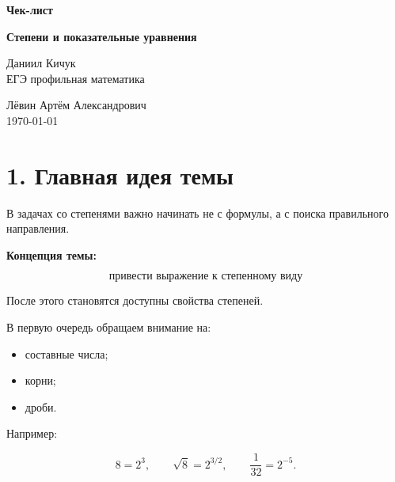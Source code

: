 \documentclass[a4paper,12pt]{article}
\begin{document}
\begin{titlepage}
\begin{center}

\vspace*{2cm}

{\Large\textcolor{darkaccent}{\textbf{Чек-лист}}}

\vspace{1cm}

{\Huge\textbf{Степени и показательные уравнения}}

\vspace{1.5cm}

{\Large Даниил Кичук}\\[0.3cm]
{\large ЕГЭ профильная математика}

\vfill

{\large Лёвин Артём Александрович}\\
{\large \today}

\vspace{1cm}


\end{center}
\end{titlepage}

\section*{1. Главная идея темы}

В задачах со степенями важно начинать не с формулы, а с поиска правильного направления.

\textbf{Концепция темы:}

\[
\boxed{\text{привести выражение к степенному виду}}
\]

После этого становятся доступны свойства степеней.

В первую очередь обращаем внимание на:

\begin{itemize}
\item составные числа;
\item корни;
\item дроби.
\end{itemize}

Например:

\[
8=2^3,\qquad
\sqrt{8}=2^{3/2},\qquad
\frac1{32}=2^{-5}.
\]
\end{document}
